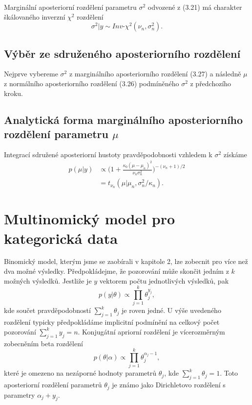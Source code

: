 Marginální aposteriorní rozdělení parametru $\sigma^2$ odvozené z (3.21) má charakter škálovaného inverzní $\chi^2$ rozdělení
\begin{equation}
\sigma^2 | y \sim \textit{Inv-}\chi^2(\nu_n, \sigma^2_n).
\end{equation}

\subsection{Výběr ze sdruženého aposteriorního rozdělení}

Nejprve vybereme $\sigma^2$ z marginálního aposteriorního rozdělení (3.27) a následně $\mu$ z normálního aposteriorního rozdělení (3.26) podmíněného $\sigma^2$ z předchozího kroku.

\subsection{Analytická forma marginálního aposteriorního rozdělení parametru $\mu$}

Integrací sdružené aposteriorní hustoty pravděpodobnosti vzhledem k $\sigma^2$ získáme
\begin{equation}
\begin{split}
p(\mu | y) & \varpropto \Big(1 + \frac{\kappa_0 (\mu - \mu_n) ^ 2}{\nu_n \sigma_n^2} \Big) ^ {-(\nu_n + 1) / 2}\\
 & = t_{\nu_n}(\mu | \mu_n, \sigma^2_n / \kappa_n).
\end{split}
\end{equation}

\section{Multinomický model pro kategorická data}

Binomický model, kterým jsme se zaobírali v kapitole 2, lze zobecnit pro více než dva možné výsledky. Předpokládejme, že pozorování může skončit jedním z $k$ možných výsledků. Jestliže je $y$ vektorem počtu jednotlivých výsledků, pak
\begin{equation}
p(y|\theta) \varpropto \prod_{j = 1}^k \theta_j^{y_j},
\end{equation}
kde součet pravděpodobností $\sum_{j = 1}^k \theta_j$ je roven jedné. U výše uvedeného rozdělení typicky předpokládáme implicitní podmínění na  celkový počet pozorování $\sum_{j = 1}^k y_j = n$. Konjugátní apriorní rozdělení je vícerozměrným zobecněním beta rozdělení
\begin{equation}
p(\theta | \alpha) \varpropto \prod_{j = 1}^k \theta_j^{\alpha_j - 1},
\end{equation}
které je omezeno na nezáporné hodnoty parametrů $\theta_j$, kde $\sum_{j = 1}^k \theta_j = 1$. Toto aposteriorní rozdělení parametrů $\theta_j$ je známo jako Dirichletovo rozdělení s parametry $\alpha_j + y_j$.

